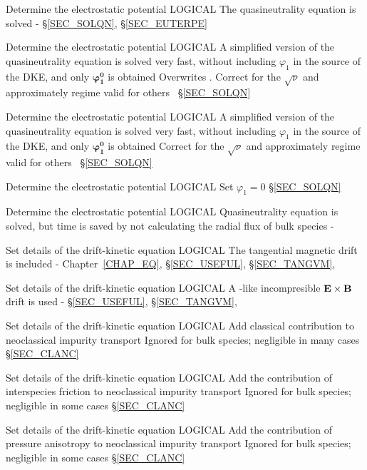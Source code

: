 {Determine the electrostatic potential}
{LOGICAL}
{The quasineutrality equation is solved}
{\true}
{-}
{\S\ref{SEC_SOLQN}, \S\ref{SEC_EUTERPE}}

{Determine the electrostatic potential}
{LOGICAL}
{A simplified version of the quasineutrality equation is solved very fast, without including $\varphi_1$ in the source of the DKE, and only $\pmb{\varphi_1^{0}}$ is obtained}
{\false}
{Overwrites . Correct for the $\sqrt{\nu}$ and approximately regime valid for others~\citep{calvo2018jpp}}
{\S\ref{SEC_SOLQN}}

{Determine the electrostatic potential}
{LOGICAL}
{A simplified version of the quasineutrality equation is solved very fast, without including $\varphi_1$ in the source of the DKE, and only $\pmb{\varphi_1^{0}}$ is obtained}
{\false}
{Correct for the $\sqrt{\nu}$ and approximately regime valid for others~\citep{calvo2018jpp}}
{\S\ref{SEC_SOLQN}}

{Determine the electrostatic potential}
{LOGICAL}
{Set $\varphi_1=0$}
{\false}
{}
{\S\ref{SEC_SOLQN}}

{Determine the electrostatic potential}
{LOGICAL}
{Quasineutrality equation is solved, but time is saved by not calculating the radial flux of bulk species}
{\false}
{-}
{}

{Set details of the drift-kinetic equation}
{LOGICAL}
{The tangential magnetic drift is included}
{\true}
{-}
{Chapter~\ref{CHAP_EQ}, \S\ref{SEC_USEFUL}, \S\ref{SEC_TANGVM}, \citep{calvo2017sqrtnu}}

{Set details of the drift-kinetic equation}
{LOGICAL}
{A \DKES-like incompresible $\mathbf{E}\times\mathbf{B}$ drift is used}
{\false}
{-}
{\S\ref{SEC_USEFUL}, \S\ref{SEC_TANGVM}, \citep{hirshman1986dkes,beidler2007icnts}}

{Set details of the drift-kinetic equation}
{LOGICAL}
{Add classical contribution to neoclassical impurity transport}
{\true}
{Ignored for bulk species; negligible in many cases}
{\S\ref{SEC_CLANC}}

{Set details of the drift-kinetic equation}
{LOGICAL}
{Add the contribution of interspecies friction to neoclassical impurity transport}
{\true}
{Ignored for bulk species; negligible in some cases}
{\S\ref{SEC_CLANC}}

{Set details of the drift-kinetic equation}
{LOGICAL}
{Add the contribution of pressure anisotropy to neoclassical impurity transport}
{\true}
{Ignored for bulk species; negligible in some cases}
{\S\ref{SEC_CLANC}}

